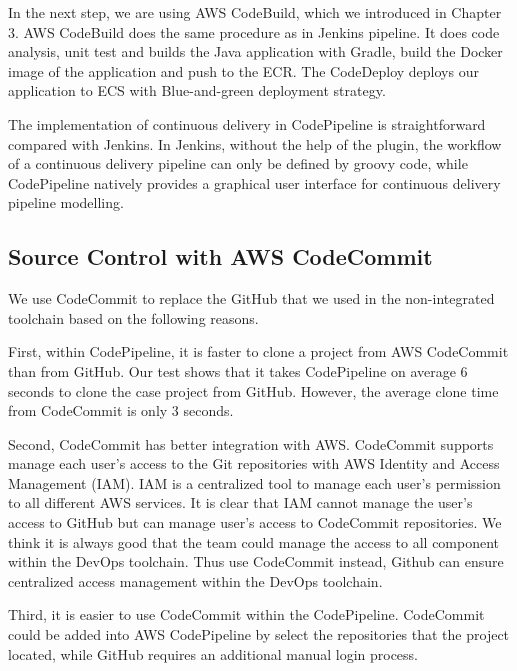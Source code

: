 \par
In the next step, we are using AWS CodeBuild, which we introduced in Chapter 3. AWS CodeBuild does the same procedure as in Jenkins pipeline. It does code analysis, unit test and builds the Java application with Gradle, build the Docker image of the application and push to the ECR. The CodeDeploy deploys our application to ECS with Blue-and-green deployment strategy.
\par
The implementation of continuous delivery in CodePipeline is straightforward compared with Jenkins. In Jenkins, without the help of the plugin, the workflow of a continuous delivery pipeline can only be defined by groovy code, while CodePipeline natively provides a graphical user interface for continuous delivery pipeline modelling. 
\subsection{Source Control with AWS CodeCommit}
We use CodeCommit to replace the GitHub that we used in the non-integrated toolchain based on the following reasons.
\par
First, within CodePipeline, it is faster to clone a project from AWS CodeCommit than from GitHub. Our test shows that it takes CodePipeline on average 6 seconds to clone the case project from GitHub. However, the average clone time from CodeCommit is only 3 seconds.
\par
Second, CodeCommit has better integration with AWS. CodeCommit supports manage each user's access to the Git repositories with AWS Identity and Access Management (IAM). IAM is a centralized tool to manage each user's permission to all different AWS services. It is clear that IAM cannot manage the user's access to GitHub but can manage user's access to CodeCommit repositories. We think it is always good that the team could manage the access to all component within the DevOps toolchain. Thus use CodeCommit instead, Github can ensure centralized access management within the DevOps toolchain.
\par
Third, it is easier to use CodeCommit within the CodePipeline. CodeCommit could be added into AWS CodePipeline by select the repositories that the project located, while GitHub requires an additional manual login process.
